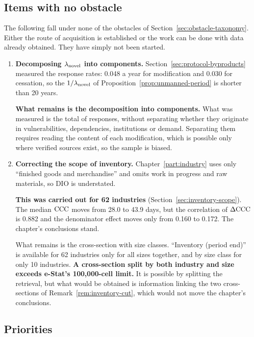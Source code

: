 \subsection{Items with no obstacle}

The following fall under none of the obstacles of Section~\ref{sec:obstacle-taxonomy}. Either
the route of acquisition is established or the work can be done with data already obtained.
They have simply not been started.

\begin{enumerate}[label=(\arabic*),start=17]
\item \textbf{Decomposing $\lambda_{\rm novel}$ into components.}
Section~\ref{sec:protocol-byproducts} measured the response rates: 0.048 a year for
modification and 0.030 for cessation, so the $1/\lambda_{\rm novel}$ of
Proposition~\ref{prop:unmanned-period} is shorter than 20 years.

\textbf{What remains is the decomposition into components.} What was measured is the total of
responses, without separating whether they originate in vulnerabilities, dependencies,
institutions or demand. Separating them requires reading the content of each modification,
which is possible only where verified sources exist, so the sample is biased.

\item \textbf{Correcting the scope of inventory.}
Chapter~\ref{part:industry} uses only ``finished goods and merchandise'' and omits
work in progress and raw materials, so $\mathrm{DIO}$ is understated.

\textbf{This was carried out for 62 industries} (Section~\ref{sec:inventory-scope}). The
median $\mathrm{CCC}$ moves from 28.0 to 43.9 days, but the correlation of $\Delta\mathrm{CCC}$ is 0.882 and
the denominator effect moves only from 0.160 to 0.172. The chapter's conclusions stand.

What remains is the cross-section with size classes. ``Inventory (period end)'' is available
for 62 industries only for all sizes together, and by size class for only 10 industries.
\textbf{A cross-section split by both industry and size exceeds e-Stat's 100{,}000-cell
limit.} It is possible by splitting the retrieval, but what would be obtained is information
linking the two cross-sections of Remark~\ref{rem:inventory-cut}, which would not move the
chapter's conclusions.

\end{enumerate}

\subsection{Priorities}

